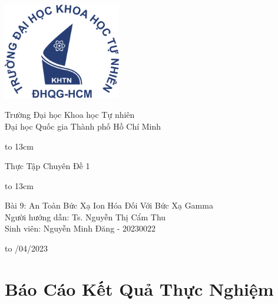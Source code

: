 \documentclass{article}
\begin{document}
{
   \setlength{\topmargin}{-0.5cm}
\begin{titlepage}
  \begin{center}
    \centerline{\includegraphics[height=42mm]{logo}}

    
   \vspace{1cm}

        {\large Trường Đại học Khoa học Tự nhiên}\\[1em]
        {\large Đại học Quốc gia Thành phố Hồ Chí Minh}
    
        \vspace{1.2cm}
    \centerline{\hbox to 13cm{\hrulefill}}
    \vspace{0.3cm}
    \Large  {{Thực Tập Chuyên Đề 1 }}
    \centerline{\hbox to 13cm{\hrulefill}}
    
    \vspace{1.2cm}
    \Large {Bài 9: An Toàn Bức Xạ Ion Hóa Đối Với Bức Xạ Gamma}\\ 
   
   \vspace{3cm}
            \large Người hướng dẫn: Ts. Nguyễn Thị Cẩm Thu \\ 
            \large Sinh viên: Nguyễn Minh Đăng - 20230022
    
    \vspace{4cm}
    

    
    \hbox to \textwidth{\hrulefill}
    \vspace{0.2cm}
    {/04/2023}
    
  \end{center}
\end{titlepage}
}

\newpage
\clearpage\thispagestyle{empty}\addtocounter{page}{-1} 
\clearpage
\mbox{}
\newpage

\section*{\centering Báo Cáo Kết Quả Thực Nghiệm}
\end{document}
